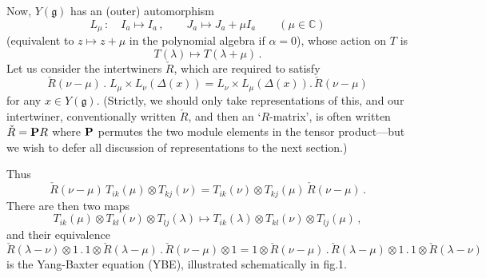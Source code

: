 \documentclass[12pt]{article}
\newcommand{\gf}{\mathfrak{g}}
\newcommand{\cR}{\check{R}}
\begin{document}
Now, $Y(\gf)$ has an (outer) automorphism \begin{equation}\label{auto}
L_\mu\,:\quad I_a\mapsto I_a\,,\qquad J_a\mapsto J_a+\mu I_a
\qquad(\mu\in{\mathbb C})\end{equation} (equivalent to $z\mapsto z+\mu$ in
the polynomial algebra if $\alpha=0$), whose action on $T$ is \begin{equation}
T(\lambda)\mapsto T(\lambda+\mu)\,.\end{equation} Let us consider the
intertwiners $\cR$, which are required to satisfy \begin{equation}\label{R}
\cR(\nu-\mu)\,. \;L_\mu\!\times\! L_\nu\left(\Delta(x)\right)
=L_\nu\!\times\! L_\mu\left(\Delta(x)\right) .\,\cR(\nu-\mu)\end{equation}
for any $x\in Y(\gf)$. (Strictly, we should only take
representations of this, and our intertwiner, conventionally
written $\cR$, and then an `$R$-matrix', is often written
$\cR={\bf P}R$ where ${\bf P}$ permutes the two module elements in
the tensor product---but we wish to defer all discussion of
representations to the next section.)

Thus \begin{equation} \label{RTT}\cR(\nu-\mu)\, T_{ik}(\mu)\otimes T_{kj}(\nu)
= T_{ik}(\nu)\otimes T_{kj}(\mu) \,\cR(\nu-\mu)\,.\end{equation}  There are
then two maps \begin{equation} T_{ik}(\mu)\otimes T_{kl}(\nu)\otimes
T_{lj}(\lambda) \mapsto T_{ik}(\lambda)\otimes T_{kl}(\nu)\otimes
T_{lj}(\mu)\,,\end{equation} and their equivalence \begin{equation}\label{YBE}
\cR(\lambda-\nu)\otimes 1\,.\, 1\otimes \cR(\lambda-\mu)\,.\,
\cR(\nu-\mu)\otimes 1 = 1\otimes\cR(\nu-\mu)\,.\,
\cR(\lambda-\mu)\otimes 1\,.\,1\otimes \cR(\lambda-\nu)\end{equation} is the
Yang-Baxter equation (YBE), illustrated schematically in fig.1.
\end{document}
